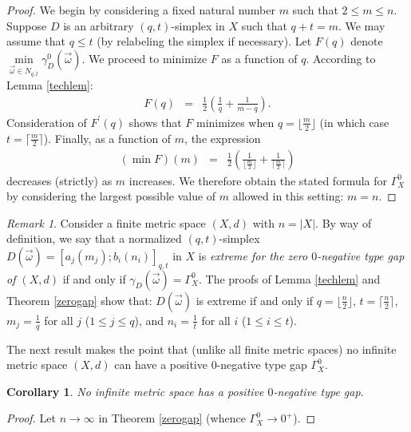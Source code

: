 \documentclass[10pt]{amsart}
\newtheorem{cor}[thm]{Corollary}
\theoremstyle{definition}
\theoremstyle{remark}
\newtheorem{rem}[thm]{Remark}
\begin{document}
\begin{proof}
We begin by considering a fixed natural number $m$ such that $2 \leq m \leq n$.
Suppose $D$ is an arbitrary $(q,t)$-simplex in $X$ such that $q+t = m$. We may assume that $q \leq t$
(by relabeling the simplex if necessary). Let $F(q)$ denote $\min\limits_{\vec{\omega} \in N_{q,t}}
\gamma_{D}^{0}(\vec{\omega})$. We proceed to minimize $F$ as a function of $q$.
According to Lemma \ref{techlem}:
\begin{eqnarray*}
F(q)  & =  & \frac{1}{2} \left( \frac{1}{q} + \frac{1}{m-q} \right).
\end{eqnarray*}
Consideration of $F^{\prime}(q)$ shows that $F$ minimizes when $q = \lfloor \frac{m}{2} \rfloor$
(in which case $t = \lceil \frac{m}{2} \rceil$). Finally, as a function of $m$, the expression
\begin{eqnarray*}
(\min F)(m) & = & \frac{1}{2} \left( \frac{1}{\lfloor \frac{m}{2} \rfloor} +
\frac{1}{\lceil \frac{m}{2} \rceil} \right)
\end{eqnarray*}
decreases (strictly) as $m$ increases. We therefore obtain the stated formula for $\Gamma_{X}^{0}$ by
considering the largest possible value of $m$ allowed in this setting: $m=n$.
\end{proof}

\begin{rem}
Consider a finite metric space $(X,d)$ with $n = |X|$. By way of definition, we say that a normalized
$(q,t)$-simplex $D(\vec{\omega}) =[a_{j}(m_{j});b_{i}(n_{i})]_{q,t}$ in $X$ is \textit{extreme for
the zero $0$-negative type gap of $(X,d)$}
if and only if $\gamma_{D}(\vec{\omega}) = \Gamma_{X}^{0}$. The proofs of Lemma \ref{techlem} and
Theorem \ref{zerogap} show that: $D(\vec{\omega})$ is extreme if and only if $q = \lfloor \frac{n}{2} \rfloor$,
$t = \lceil \frac{n}{2} \rceil$, $m_{j} = \frac{1}{q}$ for all $j$ ($1 \leq j \leq q$), and
$n_{i} = \frac{1}{t}$ for all $i$ ($1 \leq i \leq t$).
\end{rem}

The next result makes the point that (unlike all finite metric spaces) no infinite
metric space $(X,d)$ can have a positive $0$-negative type gap $\Gamma_{X}^{0}$.

\begin{cor}
No infinite metric space has a positive $0$-negative type gap.
\end{cor}

\begin{proof}
Let $n \rightarrow \infty$ in Theorem \ref{zerogap} (whence $\Gamma_{X}^{0} \rightarrow 0^{+}$).
\end{proof}
\end{document}
